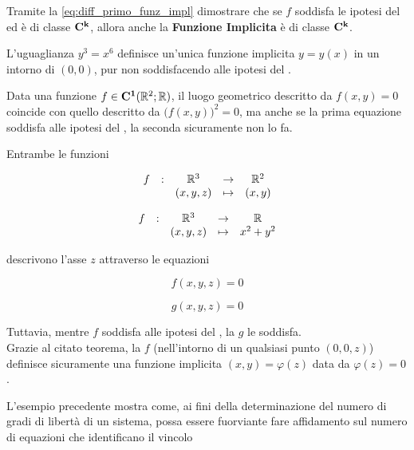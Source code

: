 \cbend
\begin{exercise}
	\label{ex:funz_impl_diff_k}
	Tramite la \cref{eq:diff_primo_funz_impl} dimostrare che se $f$ soddisfa le ipotesi del  ed è di classe $\mathbf{C^{k}}$, allora anche la \textbf{Funzione Implicita} è di classe $\mathbf{C^{k}}$.
\end{exercise}
\begin{example}
	L'uguaglianza $y^3 = x^6$ definisce un'unica funzione implicita $y = y(x)$ in un intorno di $(0,0)$, pur non soddisfacendo alle ipotesi del .
\end{example}
\begin{example}
	Data una funzione $f \in \mathbf{C^{1}}(\mathbb{R}^2;\mathbb{R})$, il luogo geometrico descritto da $f(x,y) = 0$ coincide con quello descritto da $\bigl( f(x,y) \bigr)^2 = 0$, ma anche se la prima equazione soddisfa alle ipotesi del , la seconda sicuramente non lo fa.
\end{example}
\begin{example}
	Entrambe le funzioni

	\vspace*{\baselineskip}
	\begin{minipage}{0.48\linewidth}
		\[\begin{array}{ccccc} {f} & : & {\mathbb{R}^3} & \to & {\mathbb{R}^2} \\ & & {(x,y,z)} & \mapsto & {(x,y)} \\ \end{array}\]
	\end{minipage}
	\begin{minipage}{0.48\linewidth}
		\[\begin{array}{ccccc} {f} & : & {\mathbb{R}^3} & \to & {\mathbb{R}} \\ & & {(x,y,z)} & \mapsto & {x^2+y^2} \\ \end{array}\]
	\end{minipage}

	\vspace*{\baselineskip}
	\noindent descrivono l'asse $z$ attraverso le equazioni

	\vspace*{\baselineskip}
	\begin{minipage}{0.48\linewidth}
		\[f(x,y,z) = 0\]
	\end{minipage}
	\begin{minipage}{0.48\linewidth}
		\[g(x,y,z) = 0\]
	\end{minipage}

	\vspace*{\baselineskip}
	\noindent Tuttavia, mentre $f$ soddisfa alle ipotesi del , la $g$ le soddisfa.\\
	Grazie al citato teorema, la $f$ (nell'intorno di un qualsiasi punto $(0,0,z)$) definisce sicuramente una funzione implicita $(x,y) = \varphi(z)$ data da $\varphi(z) = 0$.
	\begin{note}
		L'esempio precedente mostra come, ai fini della determinazione del numero di gradi di libertà di un sistema, possa essere fuorviante fare affidamento sul numero di equazioni che identificano il vincolo
	\end{note}
\end{example}
